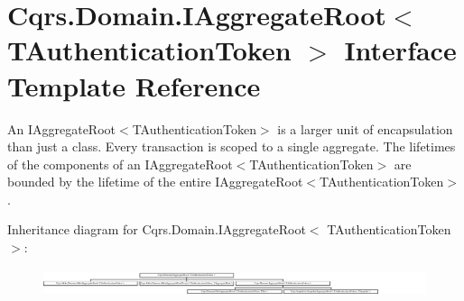\hypertarget{interfaceCqrs_1_1Domain_1_1IAggregateRoot}{}\section{Cqrs.\+Domain.\+I\+Aggregate\+Root$<$ T\+Authentication\+Token $>$ Interface Template Reference}
\label{interfaceCqrs_1_1Domain_1_1IAggregateRoot}


An I\+Aggregate\+Root$<$\+T\+Authentication\+Token$>$ is a larger unit of encapsulation than just a class. Every transaction is scoped to a single aggregate. The lifetimes of the components of an I\+Aggregate\+Root$<$\+T\+Authentication\+Token$>$ are bounded by the lifetime of the entire I\+Aggregate\+Root$<$\+T\+Authentication\+Token$>$.  


Inheritance diagram for Cqrs.\+Domain.\+I\+Aggregate\+Root$<$ T\+Authentication\+Token $>$\+:\begin{figure}[H]
\begin{center}
\leavevmode
\includegraphics[height=0.810811cm]{interfaceCqrs_1_1Domain_1_1IAggregateRoot}
\end{center}
\end{figure}
